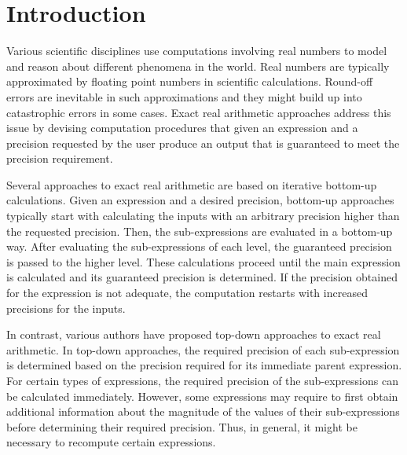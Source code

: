 \documentclass{article}
\numberwithin{mytheorem}{section}
\begin{document}




\section{Introduction}
\label{sec:intro}
Various scientific disciplines use computations involving real numbers to model and reason about different phenomena in the world. Real numbers are typically approximated by floating point numbers in scientific calculations. Round-off errors are inevitable in such approximations and they might build up into catastrophic errors in some cases. Exact real arithmetic approaches address this issue by devising computation procedures that given an expression and a precision requested by the user produce an output that is guaranteed to meet the precision requirement. 

Several approaches \cite{M01,MPFR} to exact real arithmetic are based on iterative bottom-up calculations. Given an expression and a desired precision, bottom-up approaches typically start with calculating the inputs with an arbitrary precision higher than the requested precision. Then, the sub-expressions are evaluated in a bottom-up way. After evaluating the sub-expressions of each level, the guaranteed precision is passed to the higher level. These calculations proceed until the main expression is calculated and its guaranteed precision is determined. If the precision obtained for the expression is not adequate, the computation restarts with increased precisions for the inputs. 

In contrast, various authors \cite{GL00,M05} have proposed top-down approaches to exact real arithmetic. In top-down approaches, the required precision of each sub-expression is determined based on the precision required for its immediate parent expression. For certain types of expressions, the required precision of the sub-expressions can be calculated immediately. However, some expressions may require to first obtain additional information about the magnitude of the values of their sub-expressions before determining their required precision. Thus, in general, it might be necessary to recompute certain expressions. 

\end{document}
